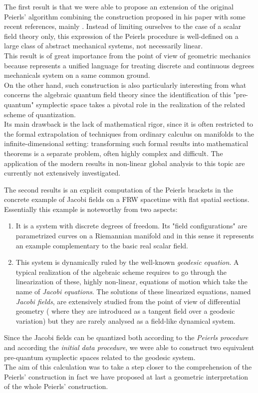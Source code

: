 \documentclass[a4paper,10pt]{amsart}
\begin{document}
The first result is that we were able to propose an extension of the original Peierls' algorithm combining the construction proposed in his paper\cite{Peierls} with some recent references, mainly \cite{Marolf}\cite{DeWitt}\cite{Forger}\cite{Sharan2010}\cite{Khavkine2014}.
Instead of limiting ourselves  to the case of a scalar field theory only, this expression of the Peierls procedure is well-defined on a large class of abstract mechanical systems, not necessarily linear.
\\
        This result is of great importance from the point of view of geometric mechanics because represents a unified language for treating discrete and continuous degrees mechanicals system on a same common ground.
        \\
        On the other hand, such construction is also particularly interesting  from what concerns the algebraic quantum field theory since 
        the identification of this "pre-quantum" symplectic space takes a pivotal role in the realization of the related scheme of quantization.
        \\
        Its main drawback is the lack of mathematical rigor, since it is often restricted to the formal extrapolation of techniques from ordinary calculus on manifolds to the infinite-dimensional setting: transforming such formal results into mathematical theorems is a separate problem, often highly complex and difficult.
        The application of the modern results in non-linear global analysis to this topic are currently not extensively investigated.


The second results is an explicit computation of the Peierls brackets in the concrete example of Jacobi fields on a FRW spacetime with flat spatial sections.
\\
Essentially this example is noteworthy from two aspects:
\begin{enumerate}
    \item It is a system with discrete degrees of freedom. 
    Its "field configurations" are parametrized curves on a Riemannian manifold and in this sense it represents an example complementary to the basic real scalar field.
    \item This system is dynamically ruled by the well-known \emph{geodesic equation}.
        A typical realization of the algebraic scheme requires to go through the linearization of these, highly non-linear, equations of motion which take the name of \emph{Jacobi equations}.
        The solutions of these linearized equations, named  \emph{Jacobi fields}, are extensively studied from the point of view of differential geometry  ( where they are introduced as a tangent field over a geodesic variation) but they are rarely analysed as a field-like dynamical system.
\end{enumerate}
Since the Jacobi fields can be quantized both according to the \emph{Peierls procedure} and according the \emph{initial data procedure}, we were able to construct two equivalent pre-quantum symplectic spaces related to the geodesic system.
\\
The aim of this calculation was to take a step closer to the comprehension of the Peierls' construction in fact we have proposed at last a  geometric interpretation of the whole Peierls' construction.
\end{document}
